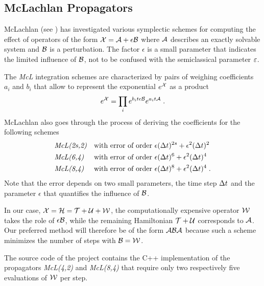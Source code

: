 \subsection{McLachlan Propagators}
\label{sub:mcl_propagator}
%
McLachlan (see \cite{McLachlan1995}) has investigated various symplectic schemes for computing the effect of operators of the form $\mathcal{X} = \mathcal{A} + \epsilon \mathcal{B}$ where $\mathcal{A}$ describes an exactly solvable system and $\mathcal{B}$ is a perturbation.
The factor $\epsilon$ is a small parameter that indicates the limited influence of $\mathcal{B}$, not to be confused with the semiclassical parameter $\varepsilon$.
\par\medskip
The \emph{McL} integration schemes are characterized by pairs of weighing coefficients $a_i$ and $b_i$ that allow to represent the exponential $e^{\mathcal{X}}$ as a product
%
\begin{align}
	e^{\mathcal{X}} = \prod_i e^{b_i t \epsilon \mathcal{B}} e^{a_i t \mathcal{A}} \; .
\end{align}
%
McLachlan also goes through the process of deriving the coefficients for the following schemes
\begin{align*}
	&\text{\emph{McL(2s,2)}} &&\text{with error of order } \epsilon (\Delta t)^{2s} + \epsilon^2 (\Delta t)^2 \\
	&\text{\emph{McL(6,4)}} &&\text{with error of order } \epsilon (\Delta t)^{6} + \epsilon^2 (\Delta t)^4 \\
	&\text{\emph{McL(8,4)}} &&\text{with error of order } \epsilon (\Delta t)^{8} + \epsilon^2 (\Delta t)^4 \; .
\end{align*}
%
Note that the error depends on two small parameters, the time step $\Delta t$ and the parameter $\epsilon$ that quantifies the influence of $\mathcal{B}$.
\par\medskip
%
In our case, $\mathcal{X} = \mathcal{H} = \mathcal{T} + \mathcal{U} + \mathcal{W}$, the computationally expensive operator $\mathcal{W}$ takes the role of $\epsilon \mathcal{B}$, while the remaining Hamiltonian $\mathcal{T} + \mathcal{U}$ corresponds to $\mathcal{A}$. 
Our preferred method will therefore be of the form $\mathcal{A} \mathcal{B} \mathcal{A}$ because such a scheme minimizes the number of steps with $\mathcal{B} = \mathcal{W}$.
\par\medskip
%
The source code of the project contains the C++ implementation of the propagators \emph{McL(4,2)} and \emph{McL(8,4)} that require only two respectively five evaluations of $\mathcal{W}$ per step.


